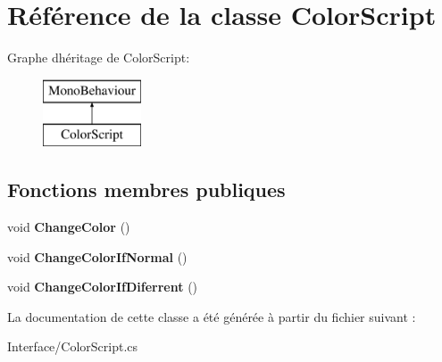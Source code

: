 \hypertarget{class_color_script}{}\section{Référence de la classe Color\+Script}
\label{class_color_script}
Graphe d\textquotesingle{}héritage de Color\+Script\+:\begin{figure}[H]
\begin{center}
\leavevmode
\includegraphics[height=2.000000cm]{class_color_script}
\end{center}
\end{figure}
\subsection*{Fonctions membres publiques}
\begin{DoxyCompactItemize}
\item 
\mbox{\label{class_color_script_a506f41b4b9b1d22d00c7e3c66e11289c}} 
void {\bfseries Change\+Color} ()
\item 
\mbox{\label{class_color_script_a5e63e47a62d8df19bfaa819a442065e5}} 
void {\bfseries Change\+Color\+If\+Normal} ()
\item 
\mbox{\label{class_color_script_a16c83ff93b5bffef7ef92d81cf8216e2}} 
void {\bfseries Change\+Color\+If\+Diferrent} ()
\end{DoxyCompactItemize}


La documentation de cette classe a été générée à partir du fichier suivant \+:\begin{DoxyCompactItemize}
\item 
Interface/Color\+Script.\+cs\end{DoxyCompactItemize}
